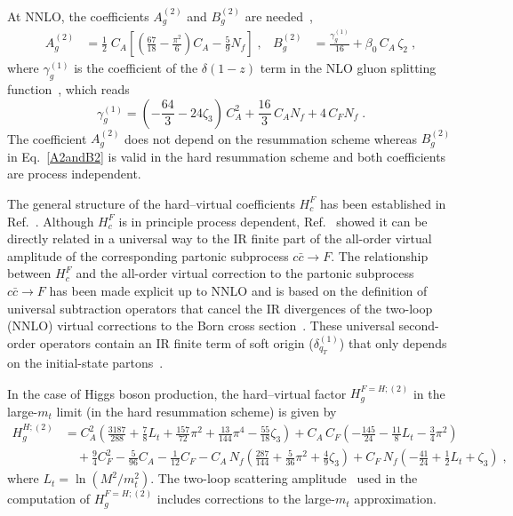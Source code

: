 \documentclass[12pt]{article}
\DeclareRobustCommand{\nn}{\nonumber}
\DeclareRobustCommand{\qt}{\ensuremath{q_T}\xspace}
\begin{document}
\begin{appendix}
At NNLO, the coefficients $A^{(2)}_{g}$ and $B^{(2)}_{g}$ are needed~\cite{Bozzi:2005wk,Catani:2013tia,deFlorian:2001zd},
\begin{align}
  A^{(2)}_{g} &= 
  \frac{1}{2}\; C_A \left[ 
    \left( \frac{67}{18} - \frac{\pi^2}{6}\right) C_A 
    -\frac{5}{9} N_f 
  \right] \;, &
  B^{(2)}_{g} &=
  \frac{\gamma_{g}^{(1)}}{16}+\beta_0\, C_A\,\zeta_2 \;,
  \label{A2andB2}
\end{align}
where $\gamma_{g}^{(1)}$ is the coefficient of the $\delta(1-z)$ term in the NLO gluon splitting function~\cite{Curci:1980uw,Furmanski:1980cm}, which reads
\begin{equation}
  \gamma_{g}^{(1)} = 
  \left(-\frac{64}3-24\zeta_3\right)\,C_A^2
  +\frac{16}3\,C_A N_f
  +4\,C_F N_f\;.
  \label{ga1g}
\end{equation}
The coefficient $A^{(2)}_{g}$ does not depend on the resummation scheme whereas $B^{(2)}_{g}$  in Eq.~\eqref{A2andB2} is valid in the hard resummation scheme and both coefficients are process independent. 

The general structure of the hard--virtual coefficients $H^{F}_{c}$ has been established in Ref.~\cite{Catani:2013tia}. Although $H^{F}_{c}$ is in principle process dependent, Ref.~\cite{Catani:2013tia} showed it can be directly related in a universal way to the IR finite part of the all-order virtual amplitude of the corresponding partonic subprocess $c{\bar c}\to F$. The relationship between $H^{F}_{c}$ and the all-order virtual correction to the  partonic subprocess $c{\bar c}\to F$ has been made explicit up to NNLO and is based on the definition of universal subtraction operators that cancel the IR divergences of the two-loop (NNLO) virtual corrections to the Born cross section~\cite{Catani:1998bh}. These universal second-order operators contain an IR finite term of soft origin ($\delta^{(1)}_{\qt}$) that only depends on the initial-state partons~\cite{Catani:2013tia}.

In the case of Higgs boson production, the hard--virtual factor $H^{F=H;(2)}_{g}$ in the large-$m_t$ limit (in the hard resummation scheme) is given by~\cite{Catani:2011kr}
\begin{align}
  H_g^{H;(2)} &=
  C_A^2 \left(
    \frac{3187}{288}+\frac{7}{8}L_t+\frac{157}{72}\pi^2+\frac{13}{144}\pi^4-\frac{55}{18}\zeta_3
  \right)
  +C_A\, C_F \left( -\frac{145}{24}-\frac{11}{8}L_t-\frac{3}{4}\pi^2\right)
  \nn\\&\quad
  +\frac{9}{4}C_F^2 -\frac{5}{96}C_A-\frac{1}{12}C_F-C_A\, N_f\left(\frac{287}{144}+\frac{5}{36}\pi^2+\frac{4}{9}\zeta_3\right)
  +C_F\, N_f\left(-\frac{41}{24}+\frac{1}{2}L_t+\zeta_3\right) \;,
  \label{H2g}
\end{align}
where $L_t=\ln (M^2/m_t^2)$. The two-loop scattering amplitude~\cite{Harlander:2009bw} used in the computation of $H^{F=H;(2)}_{g}$ includes corrections to the large-$m_t$ approximation.


\end{appendix}
\end{document}
